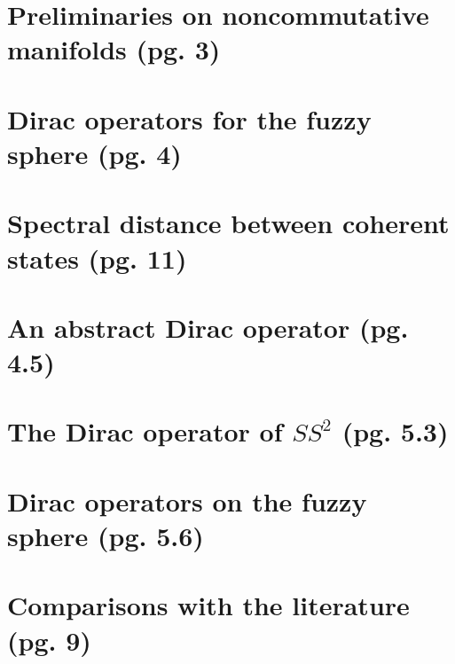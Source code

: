 \documentclass{article}
\begin{document}
\section{Preliminaries on noncommutative manifolds (pg. 3)}

\section{Dirac operators for the fuzzy sphere (pg. 4)}

\section{Spectral distance between coherent states (pg. 11)}

\section{An abstract Dirac operator (pg. 4.5)}

\section{The Dirac operator of $SS^2$ (pg. 5.3)}

\section{Dirac operators on the fuzzy sphere (pg. 5.6)}


\section{Comparisons with the literature (pg. 9)}
\end{document}
